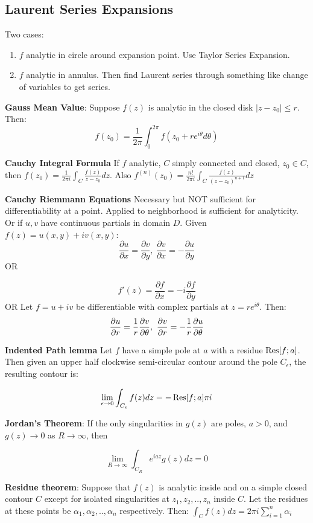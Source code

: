 \documentclass{article}
\theoremstyle{definition}
\begin{document}
\begin{multicols}{3}
\section{Laurent Series Expansions}
Two cases:
\begin{enumerate}
	\item $f$ analytic in circle around expansion point. Use Taylor Series Expansion.
	\item $f$ analytic in annulus. Then find Laurent series through something like change of variables to get series.
\end{enumerate}
\textbf{Gauss Mean Value}:
Suppose $f(z)$ is analytic in the closed disk $|z-z_0| \leq r$. Then:
$$f(z_0) = \frac{1}{2 \pi } \int_{0}^{2\pi} f(z_0 + r e^{i\theta} d\theta)$$

\textbf{Cauchy Integral Formula}
If $f$ analytic, $C$ simply connected and closed, $z_0 \in C$, then $f(z_0) = \frac{1}{2\pi i}\int_{C} \frac{f(z)}{z-z_0}dz$. Also $f^{(n)}(z_0) = \frac{n!}{2\pi i } \int_C \frac{f(z)}{(z-z_0)^{n+1}}dz$

\textbf{Cauchy Riemmann Equations} Necessary but NOT sufficient for differentiability at a point. Applied to neighborhood is sufficient for analyticity. Or if $u, v$ have continuous partials in domain $D$. 
Given $f(z) = u(x,y)+iv(x,y)$:
$$\frac{\partial u}{\partial x} = \frac{\partial v}{\partial y},\ \frac{\partial v}{\partial x} = -\frac{\partial u}{\partial y}$$
OR

$$f'(z) = \frac{\partial f}{\partial x} = -i \frac{\partial f}{\partial y}$$
OR 
Let $f=u+iv$ be differentiable with complex partials at $z=re^{i\theta}$. Then:
$$\pdv{u}{r} = \frac{1}{r} \pdv{v}{\theta},\ \pdv{v}{r} = -\frac{1}{r} \pdv{u}{\theta}$$


\textbf{Indented Path lemma}
Let $f$ have a simple pole at $a$ with a residue $\Res[f;a]$. Then given an upper half clockwise semi-circular contour around the pole $C_\epsilon$, the resulting contour is:

\begin{align}
\lim_{\epsilon\to0} \int_{C_\epsilon} f(z) dz = -\Res[f;a]\pi i
\end{align}

\textbf{Jordan's Theorem}: If the only singularities in $g(z)$ are poles, $a>0$, and $g(z) \to 0$ as $R \to \infty$, then 

$$\lim_{R \to \infty} \int_{C_R}e^{iaz}g(z) dz = 0$$

\textbf{Residue theorem}: Suppose that $f(z)$ is analytic inside and on a simple closed contour $C$ except for isolated singularities at $z_1, z_2,..,z_n$ inside $C$. Let the residues at these points be $\alpha_1, \alpha_2,..,\alpha_n$ respectively. Then:
$\int_C f(z) dz = 2 \pi i \sum_{i=1}^n \alpha_i$



\end{multicols}
\end{document}
